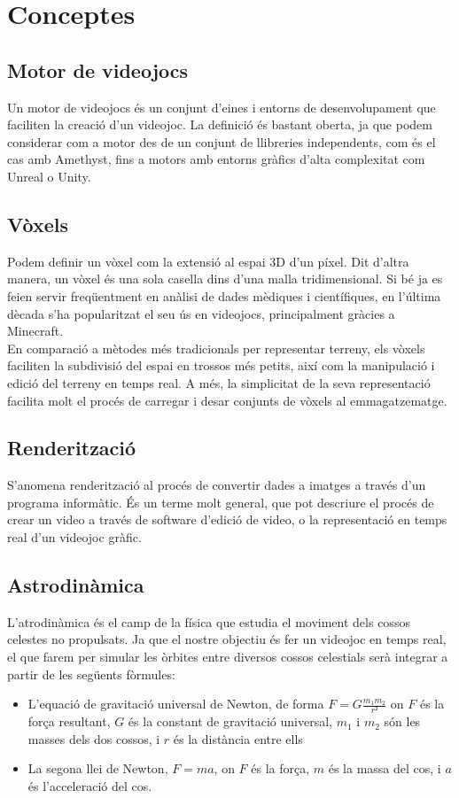 \section{Conceptes}
\subsection{Motor de videojocs}
Un motor de videojocs és un conjunt d'eines i entorns de desenvolupament que faciliten la creació d'un videojoc. La definició és bastant oberta, ja que podem considerar com a motor des de un conjunt de llibreries independents, com és el cas amb Amethyst, fins a motors amb entorns gràfics d'alta complexitat com Unreal o Unity.

\subsection{Vòxels}
Podem definir un vòxel com la extensió al espai 3D d'un píxel. Dit d'altra manera, un vòxel és una sola casella dins d'una malla tridimensional. Si bé ja es feien servir freqüentment en anàlisi de dades mèdiques i científiques, en l'última dècada s'ha popularitzat el seu ús en videojocs, principalment gràcies a Minecraft.
\\
En comparació a mètodes més tradicionals per representar terreny, els vòxels faciliten la subdivisió del espai en trossos més petits, així com la manipulació i edició del terreny en temps real. A més, la simplicitat de la seva representació facilita molt el procés de carregar i desar conjunts de vòxels al emmagatzematge.
\subsection{Renderització}
S'anomena renderització al procés de convertir dades a imatges a través d'un programa informàtic. És un terme molt general, que pot descriure el procés de crear un video a través de software d'edició de video, o la representació en temps real d'un videojoc gràfic.
\subsection{Astrodinàmica}
L'atrodinàmica és el camp de la física que estudia el moviment dels cossos celestes no propulsats. Ja que el nostre objectiu és fer un videojoc en temps real, el que farem per simular les òrbites entre diversos cossos celestials serà integrar a partir de les següents fòrmules:
\begin{itemize}
  \item L'equació de gravitació universal de Newton, de forma $F=G\frac{m_{1}m_{2}}{r²}$ on $F$ és la força resultant, $G$ és la constant de gravitació universal, $m_{1}$ i $m_{2}$ són les masses dels dos cossos, i $r$ és la distància entre ells
  \item La segona llei de Newton, $F=ma$, on $F$ és la força, $m$ és la massa del cos, i $a$ és l'acceleració del cos.
\end{itemize}


